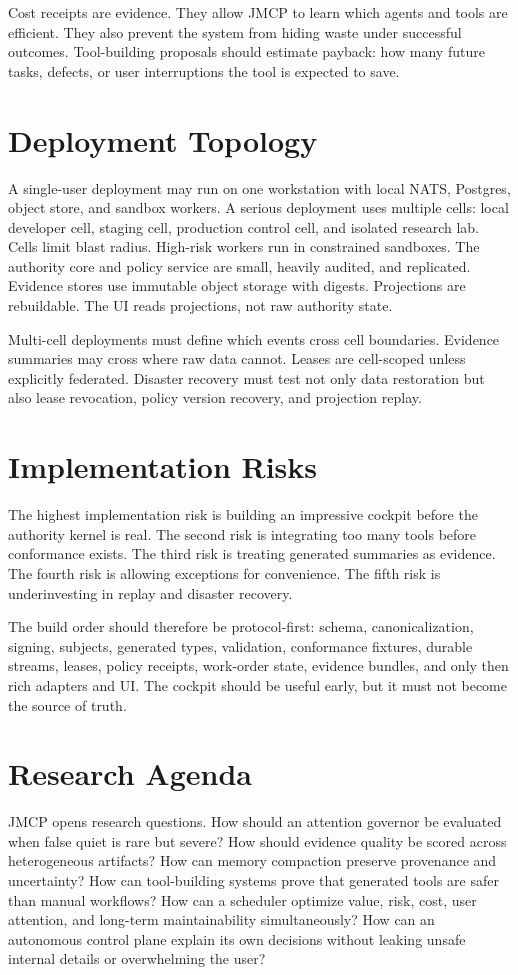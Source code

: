 \documentclass[10pt,journal,onecolumn]{IEEEtran}
\begin{document}
Cost receipts are evidence. They allow JMCP to learn which agents and tools are efficient. They also prevent the system from hiding waste under successful outcomes. Tool-building proposals should estimate payback: how many future tasks, defects, or user interruptions the tool is expected to save.

\section{Deployment Topology}
A single-user deployment may run on one workstation with local NATS, Postgres, object store, and sandbox workers. A serious deployment uses multiple cells: local developer cell, staging cell, production control cell, and isolated research lab. Cells limit blast radius. High-risk workers run in constrained sandboxes. The authority core and policy service are small, heavily audited, and replicated. Evidence stores use immutable object storage with digests. Projections are rebuildable. The UI reads projections, not raw authority state.

Multi-cell deployments must define which events cross cell boundaries. Evidence summaries may cross where raw data cannot. Leases are cell-scoped unless explicitly federated. Disaster recovery must test not only data restoration but also lease revocation, policy version recovery, and projection replay.

\section{Implementation Risks}
The highest implementation risk is building an impressive cockpit before the authority kernel is real. The second risk is integrating too many tools before conformance exists. The third risk is treating generated summaries as evidence. The fourth risk is allowing exceptions for convenience. The fifth risk is underinvesting in replay and disaster recovery.

The build order should therefore be protocol-first: schema, canonicalization, signing, subjects, generated types, validation, conformance fixtures, durable streams, leases, policy receipts, work-order state, evidence bundles, and only then rich adapters and UI. The cockpit should be useful early, but it must not become the source of truth.

\section{Research Agenda}
JMCP opens research questions. How should an attention governor be evaluated when false quiet is rare but severe? How should evidence quality be scored across heterogeneous artifacts? How can memory compaction preserve provenance and uncertainty? How can tool-building systems prove that generated tools are safer than manual workflows? How can a scheduler optimize value, risk, cost, user attention, and long-term maintainability simultaneously? How can an autonomous control plane explain its own decisions without leaking unsafe internal details or overwhelming the user?
\end{document}
